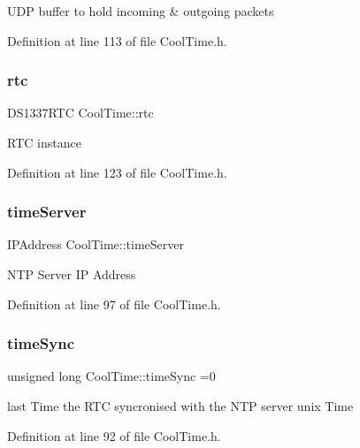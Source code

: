 U\+DP buffer to hold incoming \& outgoing packets 

Definition at line 113 of file Cool\+Time.\+h.

\mbox{\label{class_cool_time_abd38f2384ff90692b1568d9db869412e}} 
\subsubsection{\texorpdfstring{rtc}{rtc}}
{\footnotesize\ttfamily D\+S1337\+R\+TC Cool\+Time\+::rtc\hspace{0.3cm}{\ttfamily [private]}}

R\+TC instance 

Definition at line 123 of file Cool\+Time.\+h.

\mbox{\label{class_cool_time_ad2b9858f399108cb440dd1e908916f04}} 
\subsubsection{\texorpdfstring{time\+Server}{timeServer}}
{\footnotesize\ttfamily I\+P\+Address Cool\+Time\+::time\+Server\hspace{0.3cm}{\ttfamily [private]}}

N\+TP Server IP Address 

Definition at line 97 of file Cool\+Time.\+h.

\mbox{\label{class_cool_time_a9d032e76c3470a15b3bbbc52af6463f7}} 
\subsubsection{\texorpdfstring{time\+Sync}{timeSync}}
{\footnotesize\ttfamily unsigned long Cool\+Time\+::time\+Sync =0\hspace{0.3cm}{\ttfamily [private]}}

last Time the R\+TC syncronised with the N\+TP server unix Time 

Definition at line 92 of file Cool\+Time.\+h.

\mbox{\label{class_cool_time_ad33c2713c903ff064ad09c46406ae088}} 
